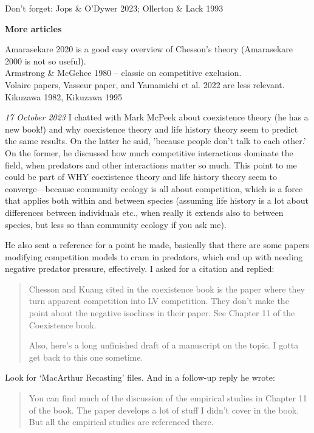\documentclass[11pt]{article}
\begin{document}
Don't forget: Jops \& O'Dywer 2023; Ollerton \& Lack 1993

{\bf More articles}

Amarasekare 2020 is a good easy overview of Chesson's theory (Amarasekare 2000 is not so useful). \\
Armstrong \& McGehee 1980 -- classic on competitive exclusion. \\
Volaire papers, Vasseur paper, and Yamamichi et al. 2022 are less relevant. \\
Kikuzawa 1982, Kikuzawa 1995


\emph{17 October 2023} I chatted with Mark McPeek about coexistence theory (he has a new book!) and why coexistence theory and life history theory seem to predict the same results. On the latter he said, 'because people don't talk to each other.' On the former, he discussed how much competitive interactions dominate the field, when predators and other interactions matter so much. This point to me could be part of WHY coexistence theory and life history theory seem to converge---because community ecology is all about competition, which is a force that applies both within and between species (assuming life history is a lot about differences between individuals etc., when really it extends also to between species, but less so than community ecology if you ask me). 

He also sent a reference for a point he made, basically that there are some papers modifying competition models to cram in predators, which end up with needing negative predator pressure, effectively. I asked for a citation and replied:  

\begin{quote}
Chesson and Kuang cited in the coexistence book is the paper where they turn apparent competition into LV competition.  They don't make the point about the negative isoclines in their paper.  See Chapter 11 of the Coexistence book.

Also, here's a long unfinished draft of a manuscript on the topic.  I gotta get back to this one sometime.
\end{quote}

Look for `MacArthur Recasting' files. And in a follow-up reply he wrote:

\begin{quote}
You can find much of the discussion of the empirical studies in Chapter 11 of the book.  The paper develops a lot of stuff I didn't cover in the book.  But all the empirical studies are referenced there.
\end{quote}
\end{document}
